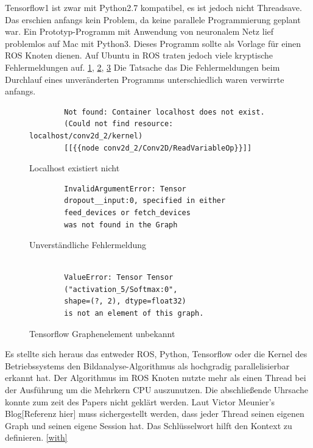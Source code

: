 \documentclass[conference]{IEEEtran}
\begin{document}
	Tensorflow1 ist zwar mit Python2.7 kompatibel, es ist jedoch nicht 
	Threadsave. Das erschien anfangs kein Problem, da keine parallele 
	Programmierung geplant war. Ein Prototyp-Programm mit Anwendung von 
	neuronalem Netz lief problemlos auf Mac mit Python3. Dieses Programm 
	sollte als Vorlage für einen ROS Knoten dienen. Auf Ubuntu in ROS traten 
	jedoch viele kryptische Fehlermeldungen auf. \ref{Error1}, \ref{Error2}, 
	\ref{Error3} Die Tatsache das Die Fehlermeldungen beim Durchlauf eines 
	unveränderten Programms unterschiedlich waren verwirrte anfangs. 
	
	\begin{figure}
		\centering
		\begin{verbatim}
		Not found: Container localhost does not exist. 
		(Could not find resource: localhost/conv2d_2/kernel)
		[[{{node conv2d_2/Conv2D/ReadVariableOp}}]]
		\end{verbatim}
		\label{Error1}
		\caption{Localhost existiert nicht}
	\end{figure}
	
	\begin{figure}
		\centering
		\begin{verbatim}
		InvalidArgumentError: Tensor 
		dropout__input:0, specified in either 
		feed_devices or fetch_devices
		was not found in the Graph
		\end{verbatim}
		\label{Error2}
		\caption{Unverständliche Fehlermeldung}
	\end{figure}
		
	\begin{figure}
		\centering
		\begin{verbatim}
		
		ValueError: Tensor Tensor
		("activation_5/Softmax:0",
		shape=(?, 2), dtype=float32) 
		is not an element of this graph.
		\end{verbatim}
		\label{Error3}
		\caption{Tensorflow Graphenelement unbekannt}
	\end{figure}
	
	Es stellte sich heraus das entweder ROS, Python, Tensorflow oder die Kernel 
	des Betriebssystems den Bildanalyse-Algorithmus als hochgradig 
	parallelisierbar erkannt hat. Der Algorithmus im  ROS Knoten nutzte mehr 
	als einen Thread bei der Ausführung um die Mehrkern CPU auszunutzen. 
	Die abschließende Uhrsache konnte zum zeit des Papers nicht geklärt 
	werden.
	Laut Victor Meunier's Blog[Referenz hier] %
	muss sichergestellt werden, dass jeder Thread seinen eigenen Graph und seinen eigene Session hat. Das Schlüsselwort  hilft den Kontext zu definieren. \ref{with} \\
	
\end{document}
